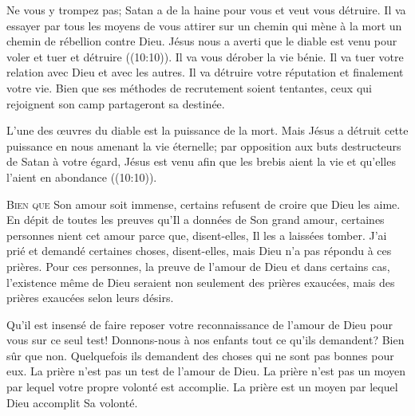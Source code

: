 
Ne vous y trompez pas; Satan a de la haine pour vous et veut vous détruire.
 Il va essayer par tous les moyens de vous attirer sur un chemin
 qui mène à la mort \ocadr un chemin de rébellion contre Dieu.
 Jésus nous a averti que le diable est venu pour
 \Og voler et tuer et détruire \Fg{} ((10:10)).
 Il va vous dérober la vie bénie. Il va tuer votre relation avec Dieu
 et avec les autres. Il va détruire votre réputation et finalement votre vie.
 Bien que ses méthodes de recrutement soient tentantes,
 ceux qui rejoignent son camp partageront sa destinée. 

L'une des \oe{}uvres du diable est la puissance de la mort.
 Mais Jésus a détruit cette puissance en nous amenant la vie éternelle; 
 par opposition aux buts destructeurs de Satan à votre égard,
 Jésus est venu \Og afin que les brebis aient la vie
 et qu'elles l'aient en abondance \Fg{} ((10:10)). 

\dvrule







\lettrine{B}{ien que} Son amour soit immense,
 certains refusent de croire que Dieu les aime.
 En dépit de toutes les preuves qu'Il a données de Son grand amour,
 certaines personnes nient cet amour parce que, disent-elles,
 Il les a laissées tomber.
 \Og J'ai prié et demandé certaines choses, disent-elles, 
 mais Dieu n'a pas répondu à ces prières. \Fg{}
 Pour ces personnes, la preuve de l'amour de Dieu
 \ocadr et dans certains cas, l'existence même de Dieu \fcadr{}
 seraient non seulement des prières exaucées,
 mais des prières exaucées selon leurs désirs. 

Qu'il est insensé de faire reposer votre reconnaissance de l'amour de Dieu
 pour vous sur ce seul test!
 Donnons-nous à nos enfants tout ce qu'ils demandent? Bien sûr que non.
 Quelquefois ils demandent des choses qui ne sont pas bonnes pour eux.
 La prière n'est pas un test de l'amour de Dieu.
 La prière n'est pas un moyen par lequel votre propre volonté est accomplie.
 La prière est un moyen par lequel Dieu accomplit Sa volonté. 

